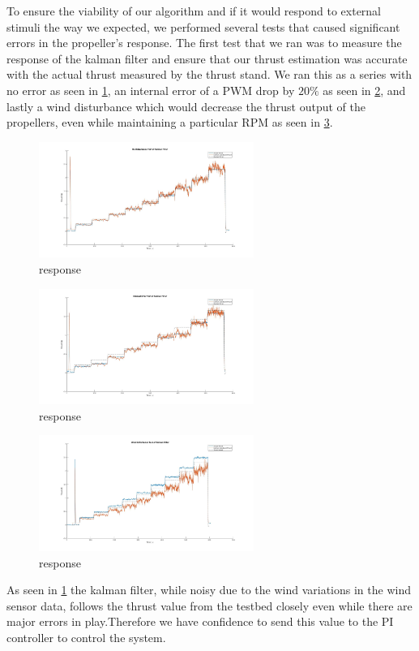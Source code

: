 \documentclass[conference]{IEEEtran}
\begin{document}
To ensure the viability of our algorithm and if it would respond to external stimuli the way we expected, we performed several tests that caused significant errors in the propeller's response. The first test that we ran was to measure the response of the kalman filter and ensure that our thrust estimation was accurate with the actual thrust measured by the thrust stand. We ran this as a series with no error as seen in \ref{kalman}, an internal error of a PWM drop by $20\%$ as seen in \ref{pwm_reduc}, and lastly a wind disturbance which would decrease the thrust output of the propellers, even while maintaining a particular RPM as seen in \ref{wind_d}.
\begin{figure}[htbp]
	\includegraphics[width=7cm]{images/Figure_2/kalman.jpg}
	\caption{response}
	\label{kalman}
\end{figure}
\begin{figure}[htbp]
	\includegraphics[width=7cm]{images/Figure_2/pwm_reduc.jpg}
	\caption{response}
	\label{pwm_reduc}
\end{figure}
\begin{figure}[htbp]
	\includegraphics[width=7cm]{images/Figure_2/wind_d.jpg}
	\caption{response}
	\label{wind_d}
\end{figure}

 As seen in \ref{kalman} the kalman filter, while noisy due to the wind variations in the wind sensor data, follows the thrust value from the testbed closely even while there are major errors in play.Therefore we have confidence to send this value to the PI controller to control the system. 
 
\end{document}
